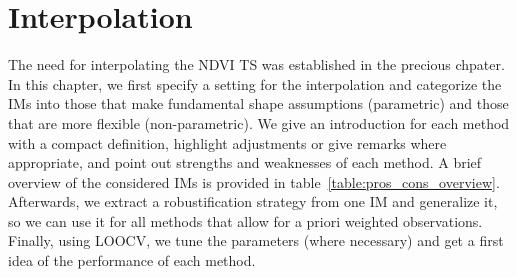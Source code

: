 \newcommand{\RobItPlot}{fitted to different (SCL45) NDVI {TS}. Iterations of a robustifying refit (as indicated in section~\ref{sec:loess_robustify}) are also displayed.}


\chapter{Interpolation} \label{sec:itpl}
	{%
		The need for interpolating the NDVI {TS} was established in the precious chpater. In this chapter, we first specify a setting for the interpolation and categorize the {{IM}}s into those that make fundamental shape assumptions (parametric) and those that are more flexible (non-parametric). We give an introduction for each method with a compact definition, highlight adjustments or give remarks where appropriate, and point out strengths and weaknesses of each method. A brief overview of the considered {{IM}}s is provided in table~\ref{table:pros_cons_overview}.
		Afterwards, we extract a robustification strategy from one {{IM}} and generalize it, so we can use it for all methods that allow for a priori weighted observations. Finally, using LOOCV, we tune the parameters (where necessary) and get a first idea of the performance of each method.


	}
	{%
		\footnotesize
		
		\normalsize
	}



